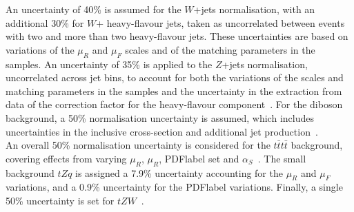 An uncertainty of 40\% is assumed for the $W$+jets normalisation, with an additional 30\% for $W$+ heavy-flavour jets, taken as uncorrelated between events with two and more than two heavy-flavour jets. These uncertainties are based on variations of the $\mu_R$ and $\mu_F$ scales and of the matching parameters in the \SHERPA samples. An uncertainty of 35\% is applied to the $Z$+jets normalisation, uncorrelated across jet bins, to account for both the variations of the scales and matching parameters in the \SHERPA samples and the uncertainty in the extraction from data of the correction factor for the heavy-flavour
component~\cite{Ball_2015,Campbell_2012}. For the diboson background, a 50\% normalisation uncertainty is assumed, which includes uncertainties in the inclusive cross-section and additional jet production~\cite{ATL-PHYS-PUB-2016-002}.\\

An overall 50\% normalisation uncertainty is considered for the $t\bar{t}t\bar{t}$ background, covering effects from varying $\mu_R$, $\mu_R$, \acrshort{PDFlabel} set and $\alpha_S$~\cite{Alwall2014,Frederix_2018}. The small background $tZq$ is assigned a 7.9\% uncertainty accounting for the $\mu_R$ and $\mu_F$ variations, and a 0.9\% uncertainty for the \acrshort{PDFlabel} variations. Finally, a single 50\% uncertainty is set for $tZW$~\cite{Alwall2014}.

